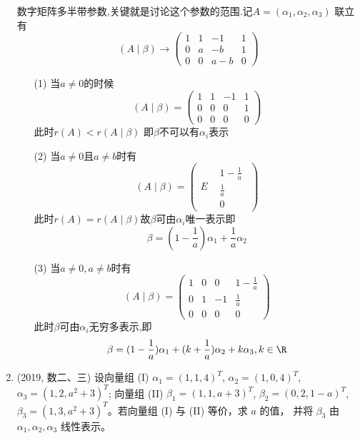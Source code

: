 \documentclass[12pt, a4paper, oneside, UTF8]{ctexbook}
\begin{document}
\begin{enumerate}[label=\arabic*.]
    \begin{solution}
    数字矩阵多半带参数,关键就是讨论这个参数的范围.记$A=\left(\alpha_1,\alpha_2,\alpha_3\right)$ 联立有
    $$
    (A\mid\beta) \rightarrow \begin{pmatrix}
        1 & 1 & -1 & 1\\
        0 & a & -b & 1 \\
        0 & 0 & a-b & 0
    \end{pmatrix}
    $$
    \begin{enumerate}
        \item [(1)] 当$a\neq 0$的时候
        $$
        (A\mid\beta) = \begin{pmatrix}
            1 & 1 & -1 & 1 \\
            0 & 0 & 0 &  1 \\
            0 & 0 & 0 & 0
        \end{pmatrix}
        $$
        此时$r(A)<r(A\mid\beta)$ 即$\beta$不可以有$\alpha_i$表示
        \item [(2)] 当$a\neq 0$且$a\neq b$时有
        $$
        (A\mid\beta) = \begin{pmatrix}
            E  & \begin{matrix}
                1 - \frac{1}{a} \\
                \frac{1}{a} \\
                0
            \end{matrix}
        \end{pmatrix}
        $$
        此时$r(A)=r(A\mid\beta)$故$\beta$可由$\alpha_i$唯一表示即
        $$
        \beta = (1-\frac{1}{a})\alpha_1+\frac{1}{a}\alpha_2
        $$
        \item [(3)] 当$a\neq 0, a\neq b$时有
        $$
        (A\mid\beta) = \begin{pmatrix}
            1 & 0 & 0 & 1-\frac{1}{a} \\
            0 & 1 & -1 & \frac{1}{a} \\
            0 & 0 & 0 & 0
        \end{pmatrix}
        $$
        此时$\beta$可由$\alpha_i$无穷多表示,即
        $$
        \beta = (1-\frac{1}{a})\alpha_1 + (k+\frac{1}{a})\alpha_2 + k\alpha_3, k\in\R 
        $$
    \end{enumerate}
    \end{solution}
    
    \item (2019, 数二、三) 设向量组 (I) $\alpha_1 = (1,1,4)^T$, $\alpha_2 = (1,0,4)^T$, $\alpha_3 = (1,2, a^2+3)^T$;
    向量组 (II) $\beta_1 = (1,1, a+3)^T$, $\beta_2 = (0,2,1-a)^T$, $\beta_3 = (1,3, a^2+3)^T$。若向量组 (I) 与 (II) 等价，求 $a$ 的值，
    并将 $\beta_3$ 由 $\alpha_1, \alpha_2, \alpha_3$ 线性表示。
    

\end{enumerate}
\end{document}
